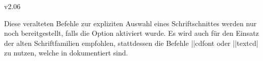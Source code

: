 \begin{Changes}{v2.06}
\begin{Obsolete}
  {}
\begin{Obsolete}
  {}
\begin{Obsolete}
  {}
\begin{Obsolete}
  {}
\begin{Obsolete}
  {}
\begin{Obsolete}
  {}
\begin{Obsolete}
  {}
\begin{Obsolete}
  {}
\begin{Obsolete}
  {}
\begin{Obsolete}
  {}
\begin{Obsolete}
  {}
\begin{Obsolete}
  {}
\begin{Obsolete}
  {}
\begin{Obsolete}
  {}
\begin{Obsolete}
  {}
\begin{Obsolete}
  {}
\begin{Obsolete}
  {}
\begin{Obsolete}
  {}
\printdeclarationlist
%
Diese veralteten Befehle zur expliziten Auswahl eines Schriftschnittes werden 
nur noch bereitgestellt, falls die Option  aktiviert wurde. 
Es wird auch für den Einsatz der alten Schriftfamilien empfohlen, stattdessen 
die Befehle \Macro||{cdfont} oder \Macro||{textcd|} zu nutzen, 
welche in  dokumentiert sind.
\end{Obsolete}
\end{Obsolete}
\end{Obsolete}
\end{Obsolete}
\end{Obsolete}
\end{Obsolete}
\end{Obsolete}
\end{Obsolete}
\end{Obsolete}
\end{Obsolete}
\end{Obsolete}
\end{Obsolete}
\end{Obsolete}
\end{Obsolete}
\end{Obsolete}
\end{Obsolete}
\end{Obsolete}
\end{Obsolete}


\end{Changes}
